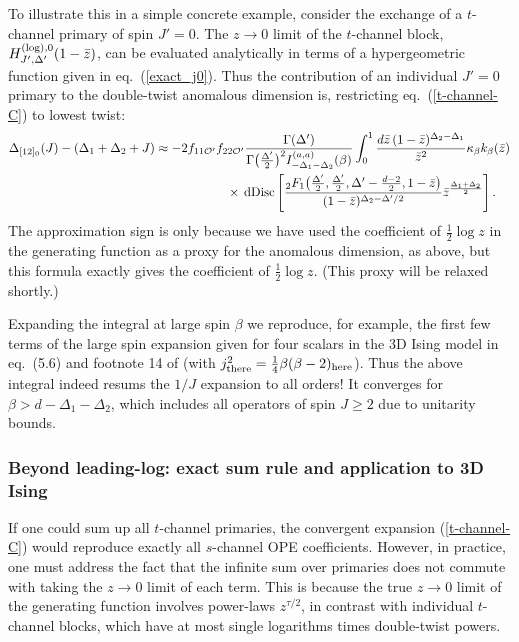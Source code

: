 \documentclass[11pt, reqno,preprint]{article}
\def\be{\begin{equation}}
\def\ee{\end{equation}}
\def\dDisc{{\rm dDisc}\,}
\def\OO{\mathcal{O}}
\def\zbar{\bar{z}}
\def\j{J}
\begin{document}
To illustrate this in a simple concrete example, consider the exchange of a $t$-channel primary of spin $\j'=0$.
The $z\to 0$ limit of the $t$-channel block, $H_{\j',\Delta'}^{({\rm log}),0}(1-\zbar)$, can be evaluated analytically
in terms of a hypergeometric function given in eq.~(\ref{exact_j0}).
Thus the contribution of an individual $\j'=0$ primary to the double-twist anomalous dimension is,
restricting eq.~(\ref{t-channel-C}) to lowest twist:
\be\begin{aligned}
\Delta_{[12]_0}(\j) -(\Delta_1+\Delta_2 +\j)
&\approx
-2f_{11\OO'}f_{22\OO'}\frac{\Gamma(\Delta')}{\Gamma\big(\tfrac{\Delta'}{2}\big)^2I_{-\Delta_1-\Delta_2}^{(a,a)}(\beta)}
\int_0^1 \frac{d\zbar\,(1-\zbar)^{\Delta_2-\Delta_1}}{\zbar^2}
\kappa_{\beta}k_{\beta}(\zbar)
\\ & \hspace{20mm}\times
\,\dDisc\!\left[\frac{{}_2F_1\big(\tfrac{\Delta'}{2},\tfrac{\Delta'}{2},\Delta'-\tfrac{d-2}{2},1-\zbar\big)}{(1-\zbar)^{\Delta_2-\Delta'/2}}
\zbar^{\frac{\Delta_1+\Delta_2}{2}}\right].
\end{aligned}\ee
The approximation sign is only because we have used the coefficient of $\tfrac12\log z$ in the generating function as a proxy for the anomalous dimension, as above, but this formula exactly gives the coefficient of $\tfrac12\log z$.
(This proxy will be relaxed shortly.)

Expanding the integral at large spin $\beta$ we reproduce, for example, the first few terms of the large spin expansion
given for four scalars in the 3D Ising model in eq.~(5.6) and footnote 14 of \cite{Alday:2015ota} (with $j^2_{\rm there}=\frac14\beta(\beta-2)_{\rm here}$). Thus the above integral indeed resums the $1/\j$ expansion to all orders! It converges for $\beta> d-\Delta_1-\Delta_2$, which includes all operators of spin $\j\geq 2$
due to unitarity bounds.

\subsubsection{Beyond leading-log: exact sum rule and application to 3D Ising}

If one could sum up all $t$-channel primaries, the convergent expansion (\ref{t-channel-C}) would reproduce exactly
all $s$-channel OPE coefficients.  However, in practice, one must
address the fact that the infinite sum over primaries does not commute with taking
the $z\to 0$ limit of each term.
This is because the true $z\to 0$ limit of the generating function involves power-laws $z^{\tau/2}$,
in contrast with individual $t$-channel blocks, which have at most single logarithms times double-twist powers.
\end{document}

